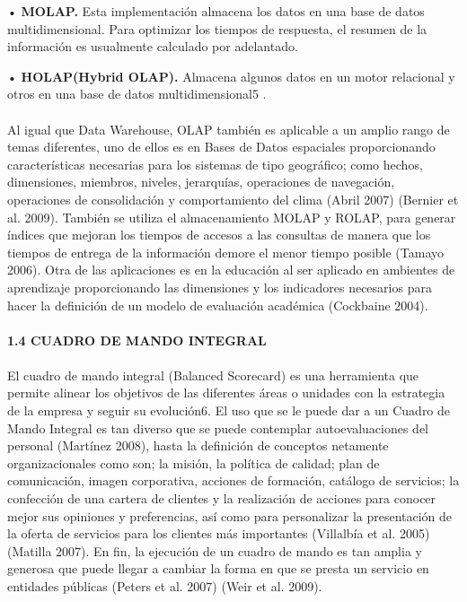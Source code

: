 \begin{flushleft}
\item • \textbf{MOLAP.} Esta implementación almacena los datos en una base de datos multidimensional. Para optimizar los tiempos de respuesta, el resumen de la información es usualmente calculado por adelantado. \textbf{}\\

\item • \textbf{ HOLAP(Hybrid OLAP).} Almacena algunos datos en un motor relacional y otros en una base de datos multidimensional5 .
\textbf{}\\
\textbf{}\\
Al igual que Data Warehouse, OLAP también es aplicable a un amplio rango de temas diferentes, uno de ellos es en Bases de Datos espaciales proporcionando características necesarias para los sistemas de tipo geográfico; como hechos, dimensiones, miembros, niveles, jerarquías, operaciones de navegación, operaciones de consolidación y comportamiento del clima (Abril 2007) (Bernier et al. 2009). También se utiliza el almacenamiento MOLAP y ROLAP, para generar índices que mejoran los tiempos de accesos a las consultas de manera que los tiempos de entrega de la información demore el menor tiempo posible (Tamayo 2006). Otra de las aplicaciones es en la educación al ser aplicado en ambientes de aprendizaje proporcionando las dimensiones y los indicadores necesarios para hacer la definición de un modelo de evaluación académica (Cockbaine 2004).\textbf{}\\
\textbf{}\\
 \textbf{1.4 CUADRO DE MANDO INTEGRAL}\\
\textbf{}\\
El cuadro de mando integral (Balanced Scorecard) es una herramienta que permite alinear los objetivos de las diferentes áreas o unidades con la estrategia de la empresa y seguir su evolución6. El uso que se le puede dar a un Cuadro de Mando Integral es tan diverso que se puede contemplar autoevaluaciones del personal (Martínez 2008), hasta la definición de conceptos netamente organizacionales como son; la misión, la política de calidad; plan de comunicación, imagen corporativa, acciones de formación, catálogo de servicios; la confección de una cartera de clientes y la realización de acciones para conocer mejor sus opiniones y preferencias, así como para personalizar la presentación de la oferta de servicios para los clientes más importantes (Villalbía et al. 2005) (Matilla 2007). En fin, la ejecución de un cuadro de mando es tan amplia y generosa que puede llegar a cambiar la forma en que se presta un servicio en entidades públicas (Peters et al. 2007) (Weir et al. 2009).\textbf{}\\

\end{flushleft}
